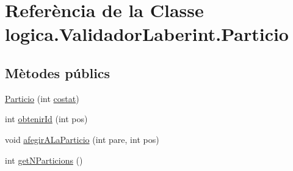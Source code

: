 \hypertarget{classlogica_1_1_validador_laberint_1_1_particio}{\section{Referència de la Classe logica.\+Validador\+Laberint.\+Particio}
\label{classlogica_1_1_validador_laberint_1_1_particio}
}
\subsection*{Mètodes públics}
\begin{DoxyCompactItemize}
\item 
\hyperlink{classlogica_1_1_validador_laberint_1_1_particio_a14003efe8fde18b0fc1e11b6e7d11ccc}{Particio} (int \hyperlink{classlogica_1_1_validador_laberint_1_1_particio_aea17b1b87c85801a9ee677412b702e83}{costat})
\item 
int \hyperlink{classlogica_1_1_validador_laberint_1_1_particio_ab9eaf05a1e8c7bbe02dfc5a31a347132}{obtenir\+Id} (int pos)
\item 
void \hyperlink{classlogica_1_1_validador_laberint_1_1_particio_a63aab2c88d6c1562d0140fde66c2e877}{afegir\+A\+La\+Particio} (int pare, int pos)
\item 
int \hyperlink{classlogica_1_1_validador_laberint_1_1_particio_a17d7870068d9eb5a9b62b568708faba6}{get\+N\+Particions} ()
\end{DoxyCompactItemize}
